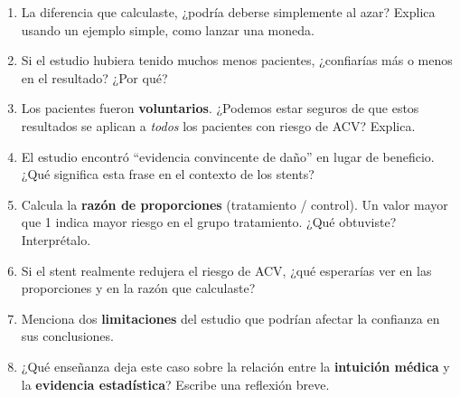 \documentclass[
  spanish,
  letterpaper,
  DIV=11,
  numbers=noendperiod]{scrartcl}
\providecommand{\tightlist}{%
  \setlength{\itemsep}{0pt}\setlength{\parskip}{0pt}}
\begin{document}
\begin{enumerate}
  \begin{enumerate}
  \def\labelenumii{\alph{enumii})}
  \tightlist
  \item
    Calcula la proporción de ACV en cada grupo.
  \item
    Calcula la diferencia entre ambas proporciones.
  \item
    A la luz de estos números, ¿dirías que los stents reducen el riesgo
    de ACV? ¿Por qué?
  \end{enumerate}
\item
  La diferencia que calculaste, ¿podría deberse simplemente al azar?
  Explica usando un ejemplo simple, como lanzar una moneda.
\item
  Si el estudio hubiera tenido muchos menos pacientes, ¿confiarías más o
  menos en el resultado? ¿Por qué?
\item
  Los pacientes fueron \textbf{voluntarios}. ¿Podemos estar seguros de
  que estos resultados se aplican a \emph{todos} los pacientes con
  riesgo de ACV? Explica.
\item
  El estudio encontró ``evidencia convincente de daño'' en lugar de
  beneficio. ¿Qué significa esta frase en el contexto de los stents?
\item
  Calcula la \textbf{razón de proporciones} (tratamiento / control). Un
  valor mayor que 1 indica mayor riesgo en el grupo tratamiento. ¿Qué
  obtuviste? Interprétalo.
\item
  Si el stent realmente redujera el riesgo de ACV, ¿qué esperarías ver
  en las proporciones y en la razón que calculaste?
\item
  Menciona dos \textbf{limitaciones} del estudio que podrían afectar la
  confianza en sus conclusiones.
\item
  ¿Qué enseñanza deja este caso sobre la relación entre la
  \textbf{intuición médica} y la \textbf{evidencia estadística}? Escribe
  una reflexión breve.
\end{enumerate}
\end{document}
